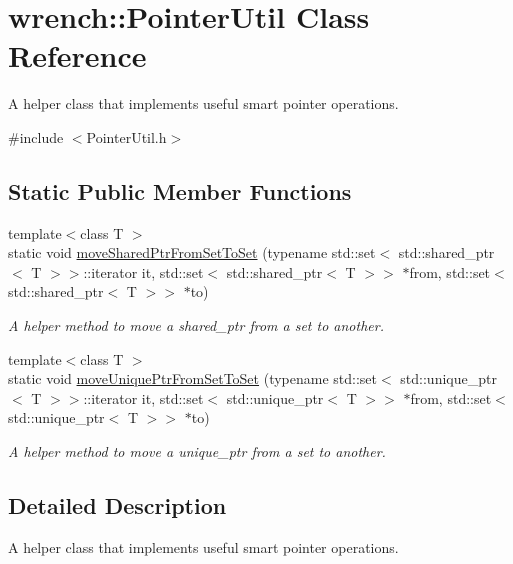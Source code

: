 \hypertarget{classwrench_1_1_pointer_util}{}\section{wrench\+:\+:Pointer\+Util Class Reference}
\label{classwrench_1_1_pointer_util}


A helper class that implements useful smart pointer operations.  




{\ttfamily \#include $<$Pointer\+Util.\+h$>$}

\subsection*{Static Public Member Functions}
\begin{DoxyCompactItemize}
\item 
{\footnotesize template$<$class T $>$ }\\static void \hyperlink{classwrench_1_1_pointer_util_a8e1a7f7b3869e1cc6f5073f39d5469cf}{move\+Shared\+Ptr\+From\+Set\+To\+Set} (typename std\+::set$<$ std\+::shared\+\_\+ptr$<$ T $>$$>$\+::iterator it, std\+::set$<$ std\+::shared\+\_\+ptr$<$ T $>$$>$ $\ast$from, std\+::set$<$ std\+::shared\+\_\+ptr$<$ T $>$$>$ $\ast$to)
\begin{DoxyCompactList}\small\item\em A helper method to move a shared\+\_\+ptr from a set to another. \end{DoxyCompactList}\item 
{\footnotesize template$<$class T $>$ }\\static void \hyperlink{classwrench_1_1_pointer_util_a0ca508842868d60a4748fe5bae2d9418}{move\+Unique\+Ptr\+From\+Set\+To\+Set} (typename std\+::set$<$ std\+::unique\+\_\+ptr$<$ T $>$$>$\+::iterator it, std\+::set$<$ std\+::unique\+\_\+ptr$<$ T $>$$>$ $\ast$from, std\+::set$<$ std\+::unique\+\_\+ptr$<$ T $>$$>$ $\ast$to)
\begin{DoxyCompactList}\small\item\em A helper method to move a unique\+\_\+ptr from a set to another. \end{DoxyCompactList}\end{DoxyCompactItemize}


\subsection{Detailed Description}
A helper class that implements useful smart pointer operations. 

